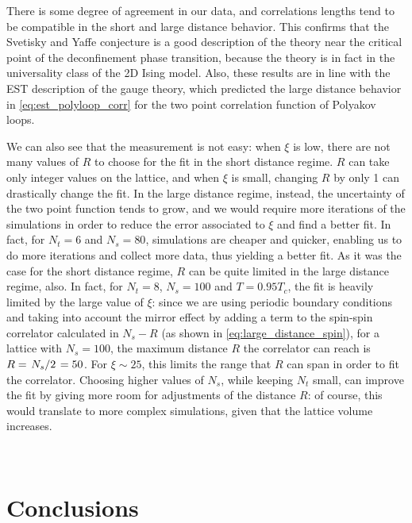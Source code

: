 \documentclass[reqno,12pt]{article}
\numberwithin{equation}{section}
\begin{document}
There is some degree of agreement in our data, and correlations lengths tend to be compatible in the short
and large distance behavior. This confirms that the Svetisky and Yaffe conjecture
is a good description of the theory near the critical point of the deconfinement phase transition, because the theory
is in fact in the universality class of the 2D Ising model. 
Also, these results are in line with the EST description
of the gauge theory, which predicted the large distance behavior in \eqref{eq:est_polyloop_corr} for the two point 
correlation function of Polyakov loops.

We can also see that the measurement is not easy: when $\xi$ is low, there
are not many values of $R$ to choose for the fit in the short distance regime. $R$ can take only integer values on the lattice,
and when $\xi$ is small, changing $R$ by only 1 can drastically change the fit. In the large distance regime, instead, the
uncertainty of the two point function tends to grow, and we would require more iterations of the simulations in order to reduce
the error associated to $\xi$ and find a better fit. In fact, for $N_t = 6$ and $N_s = 80$, simulations are cheaper and quicker,
enabling us to do more iterations and collect more data, thus yielding a better fit. As it was the case for the short distance
regime, $R$ can be quite limited in the large distance regime, also. In fact, for $N_t = 8$, $N_s = 100$ and $T = 0.95T_c$,
the fit is heavily limited by the large value of $\xi$: since we are using periodic boundary conditions and taking into 
account the mirror effect by adding a term to the spin-spin correlator calculated
in $N_s - R$ (as shown in \eqref{eq:large_distance_spin}), for a lattice with $N_s = 100$, the maximum distance $R$ the
correlator can reach is $R = \flatfrac{N_s}{2} = 50$. For $\xi \sim 25$, this limits the range that $R$ can span in order
to fit the correlator. Choosing higher values of $N_s$, while keeping $N_t$ small, can improve the fit by giving more room
for adjustments of the distance $R$: of course, this would translate to more complex simulations, given that the lattice
volume increases. 

\FloatBarrier

\newpage
\thispagestyle{empty}
\

\newpage

\section{Conclusions} \label{conclusions}
\end{document}
